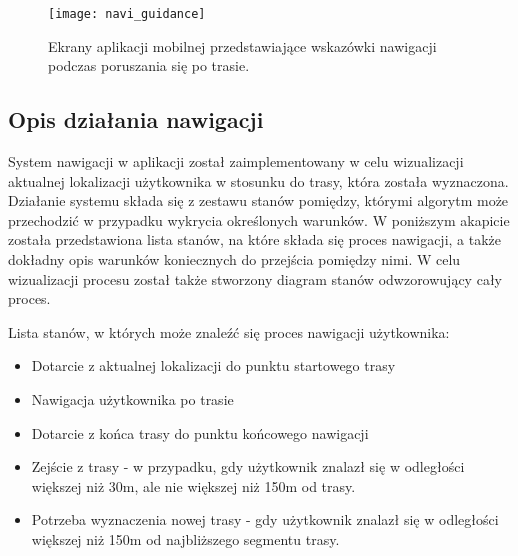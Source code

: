\begin{figure}[H]
\centering
\texttt{[image: navi\_guidance]}
\caption{Ekrany aplikacji mobilnej przedstawiające wskazówki nawigacji podczas poruszania się po trasie.}
\end{figure}

\subsection{Opis działania nawigacji}

System nawigacji w aplikacji został zaimplementowany w celu wizualizacji aktualnej lokalizacji użytkownika w stosunku do trasy, która została wyznaczona. Działanie systemu składa się z zestawu stanów pomiędzy, którymi algorytm może przechodzić w przypadku wykrycia określonych warunków. W poniższym akapicie została przedstawiona lista stanów, na które składa się proces nawigacji, a także dokładny opis warunków koniecznych do przejścia pomiędzy nimi. W celu wizualizacji procesu został także stworzony diagram stanów odwzorowujący cały proces.

Lista stanów, w których może znaleźć się proces nawigacji użytkownika:

\begin{itemize}
\item Dotarcie z aktualnej lokalizacji do punktu startowego trasy
\item Nawigacja użytkownika po trasie
\item Dotarcie z końca trasy do punktu końcowego nawigacji
\item Zejście z trasy - w przypadku, gdy użytkownik znalazł się w odległości większej niż 30m, ale nie większej niż 150m od trasy.
\item Potrzeba wyznaczenia nowej trasy - gdy użytkownik znalazł się w odległości większej niż 150m od najbliższego segmentu trasy.
\end{itemize}

